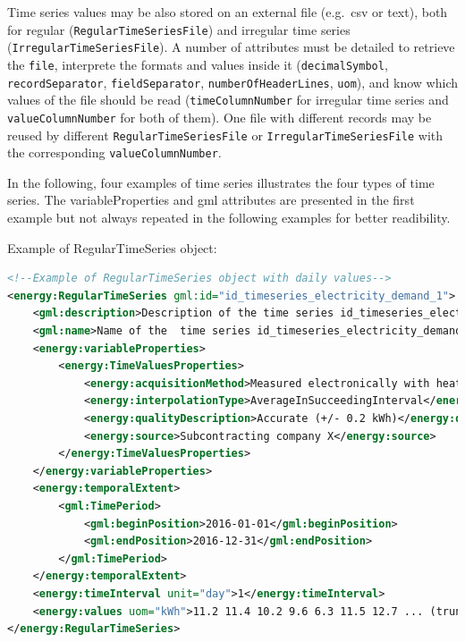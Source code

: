 \documentclass[a4paper,12pt]{article}
\begin{document}
Time series values may be also stored on an external file (e.g.~csv or
text), both for regular (\lstinline!RegularTimeSeriesFile!) and
irregular time series (\lstinline!IrregularTimeSeriesFile!). A number of
attributes must be detailed to retrieve the \lstinline!file!, interprete
the formats and values inside it (\lstinline!decimalSymbol!,
\lstinline!recordSeparator!, \lstinline!fieldSeparator!,
\lstinline!numberOfHeaderLines!, \lstinline!uom!), and know which values
of the file should be read (\lstinline!timeColumnNumber! for irregular
time series and \lstinline!valueColumnNumber! for both of them). One
file with different records may be reused by different
\lstinline!RegularTimeSeriesFile! or \lstinline!IrregularTimeSeriesFile!
with the corresponding \lstinline!valueColumnNumber!.

In the following, four examples of time series illustrates the four
types of time series. The variableProperties and gml attributes are
presented in the first example but not always repeated in the following
examples for better readibility.

Example of RegularTimeSeries object:

\begin{lstlisting}[language=XML]
<!--Example of RegularTimeSeries object with daily values-->
<energy:RegularTimeSeries gml:id="id_timeseries_electricity_demand_1">
    <gml:description>Description of the time series id_timeseries_electricity_demand_1</gml:description>
    <gml:name>Name of the  time series id_timeseries_electricity_demand_1</gml:name>
    <energy:variableProperties>
        <energy:TimeValuesProperties>
            <energy:acquisitionMethod>Measured electronically with heat power</energy:acquisitionMethod>
            <energy:interpolationType>AverageInSucceedingInterval</energy:interpolationType>
            <energy:qualityDescription>Accurate (+/- 0.2 kWh)</energy:qualityDescription>
            <energy:source>Subcontracting company X</energy:source>
        </energy:TimeValuesProperties>
    </energy:variableProperties>
    <energy:temporalExtent>
        <gml:TimePeriod>
            <gml:beginPosition>2016-01-01</gml:beginPosition>
            <gml:endPosition>2016-12-31</gml:endPosition>
        </gml:TimePeriod>
    </energy:temporalExtent>
    <energy:timeInterval unit="day">1</energy:timeInterval>
    <energy:values uom="kWh">11.2 11.4 10.2 9.6 6.3 11.5 12.7 ... (truncated, set of 365 values) </energy:values>
</energy:RegularTimeSeries>
\end{lstlisting}
\end{document}
